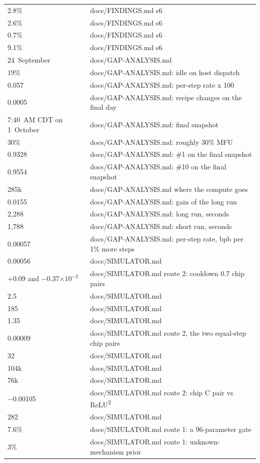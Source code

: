 \begin{longtable}{@{}p{3.6cm}p{12.0cm}@{}}
2.8\% & docs/FINDINGS.md s6 \\
2.6\% & docs/FINDINGS.md s6 \\
0.7\% & docs/FINDINGS.md s6 \\
9.1\% & docs/FINDINGS.md s6 \\
24~September & docs/GAP-ANALYSIS.md \\
19\% & docs/GAP-ANALYSIS.md: idle on host dispatch \\
0.057 & docs/GAP-ANALYSIS.md: per-step rate x 100 \\
0.0005 & docs/GAP-ANALYSIS.md: recipe changes on the final day \\
7:40~AM CDT on 1~October & docs/GAP-ANALYSIS.md: final snapshot \\
30\% & docs/GAP-ANALYSIS.md: roughly 30\% MFU \\
0.9328 & docs/GAP-ANALYSIS.md: \#1 on the final snapshot \\
0.9554 & docs/GAP-ANALYSIS.md: \#10 on the final snapshot \\
285k & docs/GAP-ANALYSIS.md where the compute goes \\
0.0155 & docs/GAP-ANALYSIS.md: gain of the long run \\
2{,}288 & docs/GAP-ANALYSIS.md: long run, seconds \\
1{,}788 & docs/GAP-ANALYSIS.md: short run, seconds \\
0.00057 & docs/GAP-ANALYSIS.md: per-step rate, bpb per 1\% more steps \\
0.00056 & docs/SIMULATOR.md \\
\ensuremath{+}0.09 and \ensuremath{-}0.37$\times10^{-3}$ & docs/SIMULATOR.md route 2: cooldown 0.7 chip pairs \\
2.5 & docs/SIMULATOR.md \\
185 & docs/SIMULATOR.md \\
1.35 & docs/SIMULATOR.md \\
0.00009 & docs/SIMULATOR.md route 2, the two equal-step chip pairs \\
32 & docs/SIMULATOR.md \\
104k & docs/SIMULATOR.md \\
76k & docs/SIMULATOR.md \\
\ensuremath{-}0.00105 & docs/SIMULATOR.md route 2: chip C pair vs ReLU\textsuperscript{2} \\
282 & docs/SIMULATOR.md \\
7.6\% & docs/SIMULATOR.md route 1: a 96-parameter gate \\
3\% & docs/SIMULATOR.md route 1: unknown-mechanism prior \\

\end{longtable}
